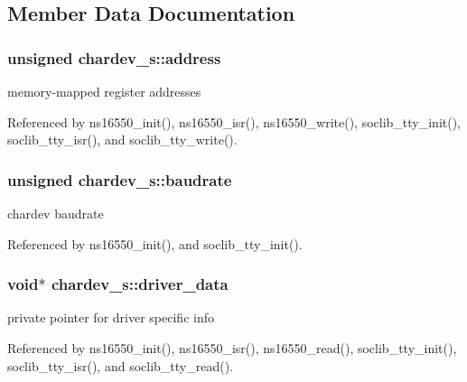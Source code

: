 \subsection{Member Data Documentation}
\hypertarget{structchardev__s_add1481ed869132ee70ac2f97038eeb4f}{
\subsubsection[{address}]{\setlength{\rightskip}{0pt plus 5cm}unsigned chardev\-\_\-s\-::address}}\label{structchardev__s_add1481ed869132ee70ac2f97038eeb4f}


memory-\/mapped register addresses 



Referenced by ns16550\-\_\-init(), ns16550\-\_\-isr(), ns16550\-\_\-write(), soclib\-\_\-tty\-\_\-init(), soclib\-\_\-tty\-\_\-isr(), and soclib\-\_\-tty\-\_\-write().

\hypertarget{structchardev__s_ae6c6d2be5ba0dcf1639a4953e745d95e}{
\subsubsection[{baudrate}]{\setlength{\rightskip}{0pt plus 5cm}unsigned chardev\-\_\-s\-::baudrate}}\label{structchardev__s_ae6c6d2be5ba0dcf1639a4953e745d95e}


chardev baudrate 



Referenced by ns16550\-\_\-init(), and soclib\-\_\-tty\-\_\-init().

\hypertarget{structchardev__s_a2265cc57d5d141a86e93b0247db7022d}{
\subsubsection[{driver\-\_\-data}]{\setlength{\rightskip}{0pt plus 5cm}void$\ast$ chardev\-\_\-s\-::driver\-\_\-data}}\label{structchardev__s_a2265cc57d5d141a86e93b0247db7022d}


private pointer for driver specific info 



Referenced by ns16550\-\_\-init(), ns16550\-\_\-isr(), ns16550\-\_\-read(), soclib\-\_\-tty\-\_\-init(), soclib\-\_\-tty\-\_\-isr(), and soclib\-\_\-tty\-\_\-read().

